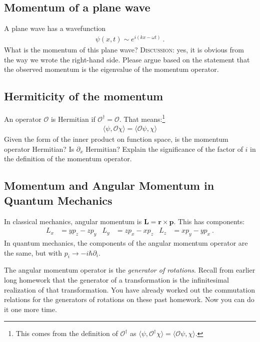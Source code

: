 \documentclass[12pt]{article}
\numberwithin{equation}{section}    %
\renewcommand{\vec}[1]{\mathbf{#1}} %
\begin{document}
\subsection{Momentum of a plane wave}

A plane wave has a wavefunction
\begin{align}
	\psi(x,t) \sim e^{i(kx - \omega t)} \ .
\end{align}
What is the momentum of this plane wave? \textsc{Discussion}: yes, it is obvious from the way we wrote the right-hand side. Please argue based on the statement that the observed momentum is the eigenvalue of the momentum operator.

\subsection{Hermiticity of the momentum}

An operator $\mathcal O$ is Hermitian if $\mathcal O^\dag = \mathcal O$. That means:\footnote{This comes from the definition of $\mathcal O^\dag$ as $\langle \psi, \mathcal O^\dag \chi \rangle = 
	\langle \mathcal O \psi,\chi \rangle$.}
\begin{align}
	\langle \psi, \mathcal O \chi \rangle = 
	\langle \mathcal O \psi,\chi \rangle
\end{align}
Given the form of the inner product on function space, is the momentum operator Hermitian? Is $\partial_x$ Hermitian? Explain the significance of the factor of $i$ in the definition of the momentum operator. 

\subsection{Momentum and Angular Momentum in Quantum Mechanics}

In classical mechanics, angular momentum is $\vec L = \vec{r} \times \vec{p}$. This has components:
\begin{align}
	L_x &= yp_z -zp_y 
	&
	L_y &= zp_x - xp_z
	&
	L_z &= xp_y - yp_x \ .
\end{align}
In quantum mechanics, the components of the angular momentum operator are the same, but with $p_i \to -i\hbar \partial_i$. 

The angular momentum operator is the \emph{generator of rotations}. Recall from earlier long homework that the generator of a transformation is the infinitesimal realization of that transformation. You have already worked out the commutation relations for the generators of rotations on these past homework. Now you can do it one more time.
\end{document}
